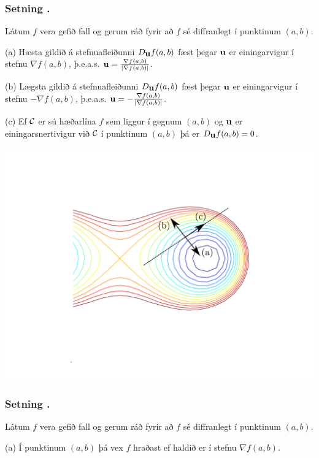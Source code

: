 \subsubsection{Setning \kaflanr.}
 Látum $f$ vera gefið fall og gerum ráð fyrir að
$f$ sé diffranlegt í punktinum $(a,b)$.

\medskip
(a)  Hæsta gildið á stefnuafleiðunni $D_{\mbox{${\bf u}$}}f(a,b)$ fæst þegar $\mbox{${\bf u}$}$
er einingarvigur í stefnu $\nabla f(a,b)$, þ.e.a.s. $\mbox{${\bf u}$}=\frac{\nabla
  f(a,b)}{|\nabla f(a,b)|}$.  

\medskip
(b)  Lægsta gildið á stefnuafleiðunni $D_{\mbox{${\bf u}$}}f(a,b)$ fæst þegar $\mbox{${\bf u}$}$
er einingarvigur í stefnu $-\nabla f(a,b)$, þ.e.a.s. $\mbox{${\bf u}$}=-\frac{\nabla
  f(a,b)}{|\nabla f(a,b)|}$. 

\medskip
(c)  Ef $\cal C$ er sú hæðarlína $f$ sem liggur í gegnum $(a,b)$ og
$\mbox{${\bf u}$}$ er einingarsnertivigur við $\cal C$ í punktinum $(a,b)$ þá er
$D_{\mbox{${\bf u}$}}f(a,b)=0$.  




   \centering
            \includegraphics[width=1\linewidth]{contours.pdf}
 

\subsubsection{Setning \kaflanr.}
Látum $f$ vera gefið fall og gerum ráð fyrir að
$f$ sé diffranlegt í punktinum $(a,b)$.  

\medskip
(a) Í punktinum $(a,b)$ þá vex $f$ hraðast ef haldið er í stefnu
$\nabla f(a,b)$.  


